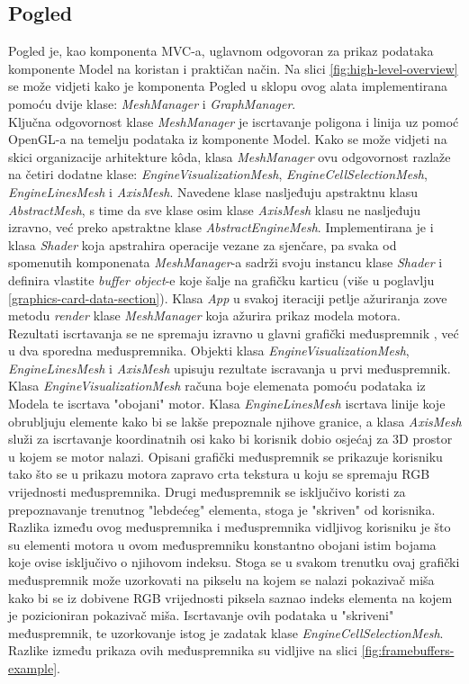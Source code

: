 \documentclass[times, utf8, diplomski]{fer}
\begin{document}
\subsection{Pogled} \label{view-section}
Pogled je, kao komponenta MVC-a, uglavnom odgovoran za prikaz podataka komponente Model na koristan i praktičan način. Na slici \ref{fig:high-level-overview} se može vidjeti kako je komponenta Pogled u sklopu ovog alata implementirana pomoću dvije klase: \textit{MeshManager} i \textit{GraphManager}.\\

Ključna odgovornost klase \textit{MeshManager} je iscrtavanje poligona i linija uz pomoć OpenGL-a na temelju podataka iz komponente Model. Kako se može vidjeti na skici organizacije arhitekture k\^{o}da, klasa \textit{MeshManager} ovu odgovornost razlaže na četiri dodatne klase: \textit{EngineVisualizationMesh}, \textit{EngineCellSelectionMesh}, \textit{EngineLinesMesh} i \textit{AxisMesh}. Navedene klase nasljeđuju apstraktnu klasu \textit{AbstractMesh}, s time da sve klase osim klase \textit{AxisMesh} klasu ne nasljeđuju izravno, već preko apstraktne klase \textit{AbstractEngineMesh}.
Implementirana je i klasa \textit{Shader} koja apstrahira operacije vezane za sjenčare, pa svaka od spomenutih komponenata \textit{MeshManager}-a sadrži svoju instancu klase \textit{Shader} i definira vlastite \textit{buffer object}-e koje šalje na grafičku karticu (više u poglavlju \ref{graphics-card-data-section}). Klasa \textit{App} u svakoj iteraciji petlje ažuriranja zove metodu \textit{render} klase \textit{MeshManager} koja ažurira prikaz modela motora.\\

Rezultati iscrtavanja se ne spremaju izravno u glavni grafički međuspremnik , već u dva sporedna međuspremnika. Objekti klasa \textit{EngineVisualizationMesh}, \textit{EngineLinesMesh} i \textit{AxisMesh} upisuju rezultate iscravanja u prvi međuspremnik. Klasa \textit{EngineVisualizationMesh} računa boje elemenata pomoću podataka iz Modela te iscrtava "obojani" motor. Klasa \textit{EngineLinesMesh} iscrtava linije koje obrubljuju elemente kako bi se lakše prepoznale njihove granice, a klasa \textit{AxisMesh} služi za iscrtavanje koordinatnih osi kako bi korisnik dobio osjećaj za 3D prostor u kojem se motor nalazi. Opisani grafički međuspremnik se prikazuje korisniku tako što se u prikazu motora zapravo crta tekstura u koju se spremaju RGB vrijednosti međuspremnika. Drugi međuspremnik se isključivo koristi za prepoznavanje trenutnog "lebdećeg" elementa, stoga je "skriven" od korisnika. Razlika između ovog međuspremnika i međuspremnika vidljivog korisniku je što su elementi motora u ovom međuspremniku konstantno obojani istim bojama koje ovise isključivo o njihovom indeksu. Stoga se u svakom trenutku ovaj grafički međuspremnik može uzorkovati na pikselu na kojem se nalazi pokazivač miša kako bi se iz dobivene RGB vrijednosti piksela saznao indeks elementa na kojem je pozicioniran pokazivač miša. Iscrtavanje ovih podataka u "skriveni" međuspremnik, te uzorkovanje istog je zadatak klase \textit{EngineCellSelectionMesh}. Razlike između prikaza ovih međuspremnika su vidljive na slici \ref{fig:framebuffers-example}.
\end{document}
